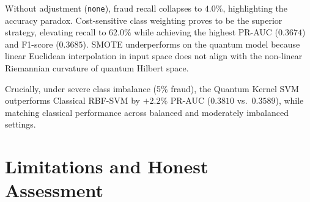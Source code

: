 \documentclass[12pt,a4paper]{article}
\begin{document}
\begin{table}[ht]
\centering
\small
\caption{Class imbalance remediation strategies and fraud ratio sensitivity.}
\label{tab:imbalance_study}
\end{table}

Without adjustment (\texttt{none}), fraud recall collapses to $4.0\%$, highlighting the accuracy paradox. Cost-sensitive class weighting proves to be the superior strategy, elevating recall to $62.0\%$ while achieving the highest PR-AUC ($0.3674$) and F1-score ($0.3685$). SMOTE underperforms on the quantum model because linear Euclidean interpolation in input space does not align with the non-linear Riemannian curvature of quantum Hilbert space.

Crucially, under severe class imbalance (5\% fraud), the Quantum Kernel SVM outperforms Classical RBF-SVM by $+2.2\%$ PR-AUC ($0.3810$ vs.\ $0.3589$), while matching classical performance across balanced and moderately imbalanced settings.

\section{Limitations and Honest Assessment}
\end{document}
